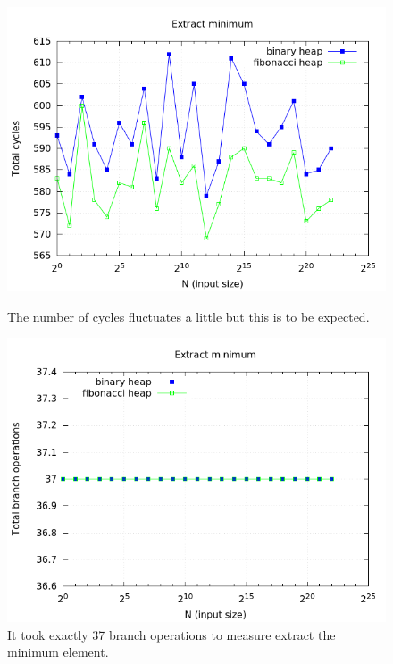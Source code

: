 \documentclass[a4paper,oneside,article,11pt]{memoir}
\begin{document}
\begin{figure}[H]
\centering
\begin{minipage}{0.48\columnwidth}
  \centering
  \includegraphics[width=\linewidth]{../res/findmin/extract_min_cycles.png}%
  \caption{The number of cycles fluctuates a little but this is to be expected.}
  \label{fig:findmin_cycles}
\end{minipage}%
\hfill
\begin{minipage}{0.48\columnwidth}
  \centering
  \includegraphics[width=\linewidth]{../res/findmin/extract_min_branch.png}%
  \caption{It took exactly 37 branch operations to measure extract the minimum element.}
  \label{fig:findmin_br}
\end{minipage}
\end{figure}
\end{document}
